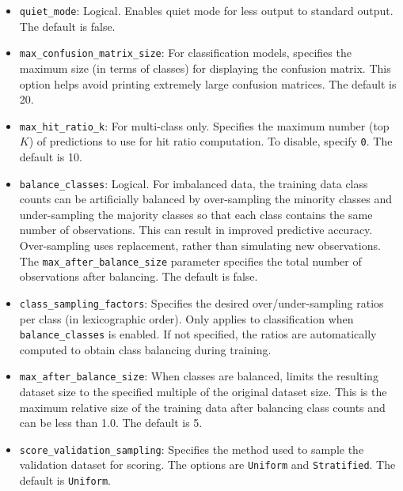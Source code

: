 {{{\begin{itemize}
\item \texttt{quiet\_mode}: Logical. Enables quiet mode for less output to standard output. The default is false.

\item \texttt{max\_confusion\_matrix\_size}: For classification models, specifies the maximum size (in terms of classes) for displaying the confusion matrix. This option helps avoid printing extremely large confusion matrices. The default is 20.

\item \texttt{max\_hit\_ratio\_k}: For multi-class only. Specifies the maximum number (top $K$) of predictions to use for hit ratio computation. To disable, specify \texttt{0}. The default is 10.

\item \texttt{balance\_classes}: Logical. For imbalanced data, the training data class counts can be artificially balanced by over-sampling the minority classes and under-sampling the majority classes so that each class  contains the same number of observations.  This can result in improved predictive accuracy.  Over-sampling  uses replacement, rather than simulating new observations. The \texttt{max\_after\_balance\_size} parameter specifies the total number of observations after balancing. The default is false.

\item \texttt{class\_sampling\_factors}: Specifies the desired over/under-sampling ratios per class (in lexicographic order). Only applies to classification when \texttt{balance\_classes} is enabled. If not specified, the ratios are automatically computed to obtain class balancing during training.

\item \texttt{max\_after\_balance\_size}: When classes are balanced, limits the resulting dataset size to the specified multiple of the original dataset size. This is the maximum relative size of the training data after balancing class counts and can be less than 1.0. The default is 5.

\item \texttt{score\_validation\_sampling}: Specifies the method used to sample the validation dataset for scoring. The options are \texttt{Uniform} and \texttt{Stratified}. The default is \texttt{Uniform}.


\end{itemize}}}}
